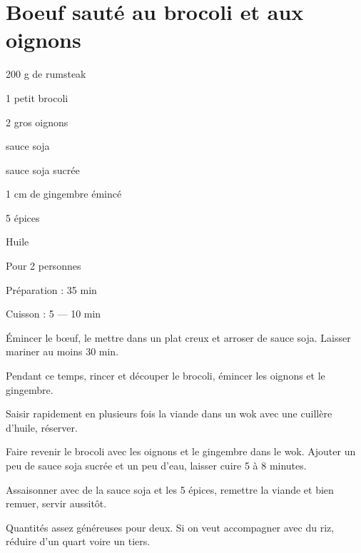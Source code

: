 \section[\normalsize{Boeuf saut\'e au brocoli et aux oignons}]{Boeuf saut\'e au brocoli et aux oignons}

\begin{ingredients}
\item 200 g de rumsteak
\item 1 petit brocoli
\item 2 gros oignons
\item sauce soja
\item sauce soja sucr\'ee
\item 1 cm de gingembre \'eminc\'e
\item 5 \'epices
\item Huile
\end{ingredients}
\begin{infos}
\item Pour 2 personnes
\item Préparation : 35 min
\item Cuisson : 5 --- 10 min
\end{infos}
\begin{etapes}
\item Émincer le bœuf, le mettre dans un plat creux et arroser de sauce soja. Laisser mariner au moins 30 min.
\item Pendant ce temps, rincer et d\'ecouper le brocoli, \'emincer les oignons et le gingembre.
\item Saisir rapidement en plusieurs fois la viande dans un wok avec une cuill\`ere d'huile, r\'eserver. 
\item Faire revenir le brocoli avec les oignons et le gingembre dans le wok. Ajouter un peu de sauce soja sucr\'ee et un peu d'eau, laisser cuire 5 \`a 8 minutes.
\item Assaisonner avec de la sauce soja et les 5 \'epices, remettre la viande et bien remuer, servir aussitôt.
\end{etapes}
\begin{conseils}
Quantit\'es assez g\'en\'ereuses pour deux. Si on veut accompagner avec du riz, r\'eduire d'un quart voire un tiers.
\end{conseils}

